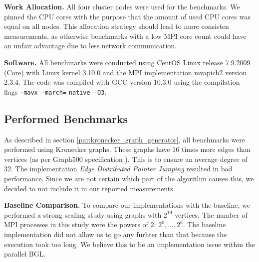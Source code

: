 \documentclass[letterpaper]{article}
\newcommand{\mypar}[1]{{\bf #1.}}
\begin{document}
\mypar{Work Allocation}
All four cluster nodes were used for the benchmarks. We pinned the CPU cores with the purpose that the amount of used
CPU cores was equal on all nodes. This allocation strategy should lead to more consisten measurements, as otherwise
benchmarks with a low MPI core count could have an unfair advantage due to less network communication.

\mypar{Software}
All benchmarks were conducted using CentOS Linux release 7.9.2009 (Core) with Linux kernel 3.10.0 and the MPI
implementation mvapich2 version 2.3.4. The code was compiled with GCC version 10.3.0 using the compilation flags
\lstinline[basicstyle=\ttfamily\color{black},identifierstyle=\color{black}]|-mavx -march=| \linebreak
\lstinline[basicstyle=\ttfamily\color{black},identifierstyle=\color{black}]|native -O3|.

\subsection{Performed Benchmarks}
As described in section \ref{par:kronecker_graph_generator}, all benchmarks were performed using Kronecker graphs. These
graphs have $16$ times more edges than vertices (as per Graph500 specification \cite{graph500}). This is to ensure an
average degree of $32$. The implementation \emph{Edge Distributed Pointer Jumping} resulted in bad performance.
Since we are not certain which part of the algorithm causes this, we decided to not include it in our reported
measurements. %

\mypar{Baseline Comparison}
To compare our implementations with the baseline, we performed a strong scaling study using graphs with $2^{19}$
vertices. The number of MPI processes in this study were the powers of $2$: $2^0, \dotsc, 2^6$. The baseline
implementation did not allow us to go any furhter than that because the execution took too long. We believe this to be
an implementation issue within the parallel BGL.
\end{document}
